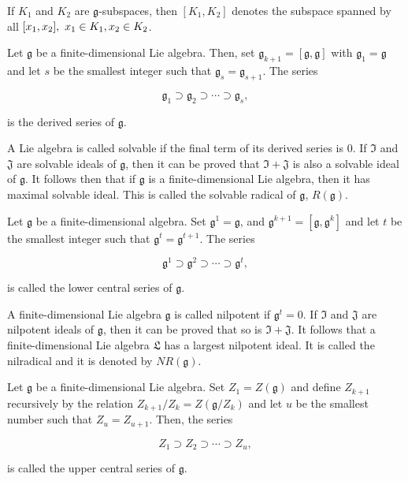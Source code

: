\documentclass{homework}
\begin{document}
If $K_1$ and $K_2$ are $\mathfrak{g}$-subspaces, then $[K_1, K_2]$ denotes the subspace spanned by all $[x_1, x_2], \textnormal{ } x_1 \in {K}_1, x_2 \in  {K}_2$. 

\begin{df}
Let $\mathfrak{g}$ be a finite-dimensional Lie algebra. Then, set $\mathfrak{g}_{k+1} = [\mathfrak{g}, \mathfrak{g}]$ with $\mathfrak{g}_1 = \mathfrak{g}$ and let $s$ be the smallest integer such that $\mathfrak{g}_s = \mathfrak{g}_{s+1}$. The series 

$$
    \mathfrak{g}_1 \supset \mathfrak{g}_2 \supset \cdots \supset \mathfrak{g}_s,
$$

is the derived series of $\mathfrak{g}$.
\end{df}

A Lie algebra is called solvable if  the final term of its derived series is 0. If $\mathfrak{I}$ and $\mathfrak{J}$ are solvable ideals of $\mathfrak{g}$, then it can be proved that $\mathfrak{I} + \mathfrak{J}$ is also a solvable ideal of $\mathfrak{g}$. It follows then that if $\mathfrak{g}$ is a finite-dimensional Lie algebra, then it has maximal solvable ideal. This is called the solvable radical of $\mathfrak{g}$, $R(\mathfrak{g})$. \\

\begin{df}
Let $\mathfrak{g}$ be a finite-dimensional algebra. Set $\mathfrak{g}^1 = \mathfrak{g}$, and $\mathfrak{g}^{k+1} = [\mathfrak{g}, \mathfrak{g}^{k}]$ and let $t$ be the smallest integer such that $\mathfrak{g}^t = \mathfrak{g}^{t+1}$. The series 

$$
    \mathfrak{g}^1 \supset \mathfrak{g}^2 \supset \cdots \supset \mathfrak{g}^t,
$$

is called the lower central series of $\mathfrak{g}$.
\end{df}

A finite-dimensional Lie algebra $\mathfrak{g}$ is called nilpotent if $\mathfrak{g}^t = 0$. If $\mathfrak{I}$ and $\mathfrak{J}$ are nilpotent ideals of $\mathfrak{g}$, then it can be proved that so is $\mathfrak{I} + \mathfrak{J}$. It follows that a finite-dimensional Lie algebra $\mathfrak{L}$ has a largest nilpotent ideal. It is called the nilradical and it is denoted by $NR(\mathfrak{g})$. \\

\begin{df}
Let $\mathfrak{g}$ be a finite-dimensional Lie algebra. Set $Z_1 = Z(\mathfrak{g})$ and define ${Z}_{k+1}$ recursively by the relation ${Z}_{ k+1}/Z_{k} = Z(\mathfrak{g}/Z_k)$ and let $u$ be the smallest number such that $Z_u = Z_{u+1}$. Then, the series 

$$
    {Z}_1 \supset {Z}_2 \supset \cdots \supset {Z}_u,
$$

is called the upper central series of $\mathfrak{g}$. 
\end{df}
\end{document}
